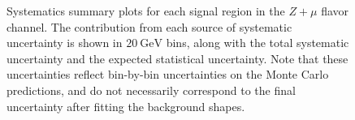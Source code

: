 \begin{figure}[p]
{	}
	\caption{Systematics summary plots for each signal region in the $Z+\mu$ flavor channel. The contribution from each source of systematic uncertainty is shown in $20~\mbox{GeV}$ bins, along with the total systematic uncertainty and the expected statistical uncertainty. Note that these uncertainties reflect bin-by-bin uncertainties on the Monte Carlo predictions, and do not necessarily correspond to the final uncertainty after fitting the background shapes.}
	\label{fig:systematics-summary-Zmu}
\end{figure}


